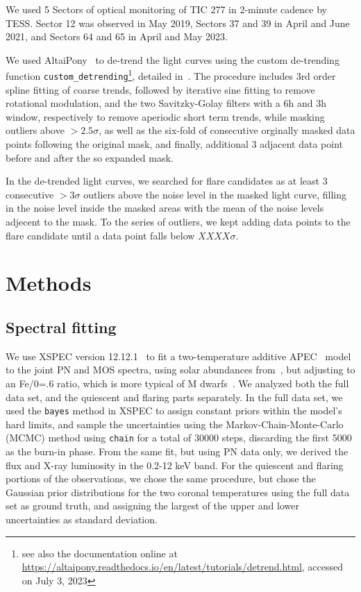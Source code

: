 \documentclass[twocolumn]{aastex631}
\begin{document}
We used 5 Sectors of optical monitoring of TIC 277 in 2-minute cadence by TESS. Sector 12 was observed in May 2019, Sectors 37 and 39 in April and June 2021, and Sectors 64 and 65 in April and May 2023. 

We used AltaiPony~\citep{ilin2021altaipony} to de-trend the light curves using the custom de-trending function \texttt{custom\_detrending}\footnote{see also the documentation online at \url{https://altaipony.readthedocs.io/en/latest/tutorials/detrend.html}, accessed on July 3, 2023}, detailed in~\citet{ilin2022searching}. The procedure includes 3rd order spline fitting of coarse trends, followed by iterative sine fitting to remove rotational modulation, and the two Savitzky-Golay filters with a 6h and 3h window, respectively to remove aperiodic short term trends, while masking outliers above $>2.5\sigma$, as well as the six-fold of consecutive orginally masked data points following the original mask, and finally, additional 3 adjacent data point before and after the so expanded mask. 

In the de-trended light curves, we searched for flare candidates as at least 3 consecutive $>3\sigma$ outliers above the noise level in the masked light curve, filling in the noise level inside the masked areas with the mean of the noise levels adjecent to the mask. To the series of outliers, we kept adding data points to the flare candidate until a data point falls below $XXXX\sigma$. 

\section{Methods}
\label{sec:methods}


\subsection{Spectral fitting}
We use XSPEC version 12.12.1~\citep{arnaud1996xspec} to fit a two-temperature additive APEC~\citep{smith2001collisional,foster2012updated} model to the joint PN and MOS spectra, using solar abundances from~\citet{grevesse1998standard}, but adjusting to an Fe/0=.6 ratio, which is more typical of M dwarfs~\citep{wood2018chandra}. We analyzed both the full data set, and the quiescent and flaring parts separately. In the full data set, we used the \texttt{bayes} method in XSPEC to assign constant priors within the model's hard limits, and sample the uncertainties using the Markov-Chain-Monte-Carlo (MCMC) method using \texttt{chain} for a total of 30000 steps, discarding the first 5000 as the burn-in phase. From the same fit, but using PN data only, we derived the flux and X-ray luminosity in the 0.2-12 keV band. For the quiescent and flaring portions of the observations, we chose the same procedure, but chose the Gaussian prior distributions for the two coronal temperatures using the full data set as ground truth, and assigning the largest of the upper and lower uncertainties as standard deviation.
\end{document}
